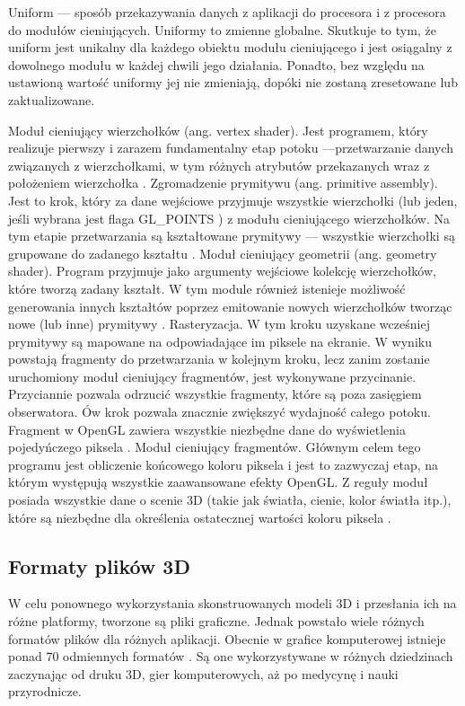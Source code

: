 Uniform --- sposób przekazywania danych z aplikacji do procesora i z procesora do modułów cieniujących. Uniformy to zmienne globalne. Skutkuje to tym, że uniform jest unikalny dla każdego obiektu modułu cieniującego i jest osiągalny z dowolnego modułu w każdej chwili jego działania. Ponadto, bez względu na ustawioną wartość uniformy jej nie zmieniają, dopóki nie zostaną zresetowane lub zaktualizowane.
\begin{itemize} 
\itemi Moduł cieniujący wierzchołków (ang. vertex shader). Jest programem, który realizuje pierwszy i zarazem fundamentalny etap potoku ---przetwarzanie danych związanych z wierzchołkami, w tym różnych atrybutów przekazanych wraz z położeniem wierzchołka \cite{slownik}.
\itemi Zgromadzenie prymitywu (ang. primitive assembly). Jest to krok, który za dane wejściowe przyjmuje wszystkie wierzchołki (lub jeden, jeśli wybrana jest flaga GL\_POINTS ) z modułu cieniującego wierzchołków. Na tym etapie przetwarzania są kształtowane prymitywy --- wszystkie wierzchołki są grupowane do zadanego kształtu \cite{opengltutorial}.
\itemi Moduł cieniujący geometrii (ang. geometry shader). Program przyjmuje jako argumenty wejściowe kolekcję wierzchołków, które tworzą zadany kształt. W tym module również istenieje możliwość generowania innych kształtów poprzez emitowanie nowych wierzchołków tworząc nowe (lub inne) prymitywy \cite{slownik}. 
\itemi Rasteryzacja. W tym kroku uzyskane wcześniej prymitywy są mapowane na odpowiadające im piksele na ekranie. W wyniku powstają fragmenty do przetwarzania w kolejnym kroku, lecz zanim zostanie uruchomiony moduł cieniujący fragmentów, jest wykonywane przycinanie. Przyciannie pozwala odrzucić wszystkie fragmenty, które są poza zasięgiem obserwatora. Ów krok pozwala znacznie zwiększyć wydajność całego potoku. Fragment w OpenGL zawiera wszystkie niezbędne dane do wyświetlenia pojedyńczego piksela \cite{slownik}.
\itemi Moduł cieniujący fragmentów. Głównym celem tego programu jest obliczenie końcowego koloru piksela i jest to zazwyczaj etap, na którym występują wszystkie zaawansowane efekty OpenGL. Z reguły moduł posiada wszystkie dane o scenie 3D (takie jak światła, cienie, kolor światła itp.), które są niezbędne dla określenia ostatecznej wartości koloru piksela \cite{slownik}.
\end{itemize}

\newpage
\subsection{Formaty plików 3D}
W celu ponownego wykorzystania skonstruowanych modeli 3D i przesłania ich na różne platformy, tworzone są pliki graficzne. Jednak powstało wiele różnych formatów plików dla różnych aplikacji. Obecnie w grafice komputerowej istnieje ponad 70 odmiennych formatów \cite{formatslist}. Są one wykorzystywane w różnych dziedzinach zaczynając od druku 3D, gier komputerowych, aż po medycynę i nauki przyrodnicze. 

